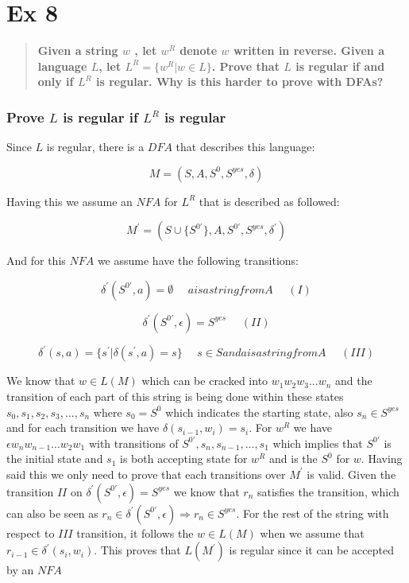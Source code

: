 \documentclass[titlepage]{article}\usepackage[]{graphicx}\usepackage[]{color}
\begin{document}
\section*{Ex 8}
\begin{quote}
  \textbf{Given a string $w$ , let $w^R$ denote $w$ written in reverse.
    Given a language $L$, let $L^R = \{w^R | w \in L \}$. Prove that $L$ is regular if and
    only if $L^R$ is regular. Why is this harder to prove with DFAs?}
\end{quote}
\subsubsection{Prove $L$ is regular if $L^R$ is regular}
Since $L$ is regular, there is a $DFA$ that describes this language:

\[ 
  M = (S, A, S^0, S^{yes}, \delta)
\]

Having this we assume an $NFA$ for $L^R$ that is described as followed:

\[ 
  M^{\prime} = (S \cup \{S^{0\prime}\}, A, S^{0\prime}, S^{yes}, \delta^{\prime})
\]

And for this $NFA$ we assume have the following transitions:

\[ 
  \delta^{\prime}(S^{0\prime}, a) = \emptyset ~~~~~~ a is a string from A~~~~~~ (I)
\]

\[ 
  \delta^{\prime}(S^{0\prime}, \epsilon) = S^{yes}~~~~~~ (II)
\]

\[ 
  \delta^{\prime}(s, a) = \{s^{\prime} | \delta(s^{\prime}, a) = s\} 	~~~~~~	s \in S and a is a string from A ~~~~~~ (III)
\]

We know that $w \in L(M)$ which can be cracked into $w_1 w_2 w_3 ... w_n$ and the transition of each part of this string is being done within these states $s_0,s_1,s_2,s_3,...,s_n$ where $s_0=S^0$ which indicates the starting state, also $s_n \in S^{yes}$ and for each transition we have $\delta(s_{i-1}, w_i) = s_i$. For $w^R$ we have $\epsilon w_n w_{n-1} ... w_2 w_1 $ with transitions of $S^{0\prime}, s_n, s_{n-1}, ..., s_1$ which implies that $S^{0\prime}$ is the initial state and $s_1$ is both accepting state for $w^R$ and is the $S^0$ for $w$. Having said this we only need to prove that each transitions over $M^{\prime}$ is valid. Given the transition $II$ on $\delta^{\prime}(S^{0\prime}, \epsilon) = S^{yes}$ we know that $r_n$ satisfies the transition, which can also be seen as $r_n \in \delta^{\prime}(S^{0\prime}, \epsilon) \Longrightarrow r_n \in S^{yes}$. For the rest of the string with respect to $III$ transition, it follows the $w \in L(M)$ when we assume that $r_{i-1} \in \delta^{\prime}(s_i, w_i)$.
This proves that $L(M^\prime)$ is regular since it can be accepted by an $NFA$
\end{document}
